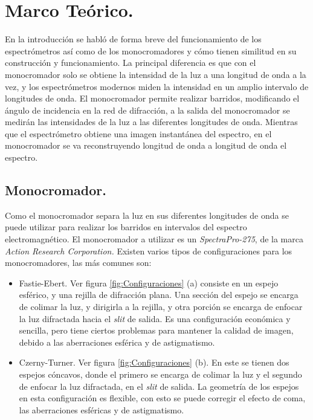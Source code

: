 \chapter{Marco Teórico.}
En la introducción se habló de forma breve del funcionamiento de los espectrómetros así como de los monocromadores y cómo tienen similitud en su construcción y funcionamiento. La principal diferencia es que con el monocromador solo se obtiene la intensidad de la luz a una longitud de onda a la vez, y los espectrómetros modernos miden la intensidad en un amplio intervalo de longitudes de onda. El monocromador permite realizar barridos, modificando el ángulo de incidencia en la red de difracción, a la salida del monocromador se medirán las intensidades de la luz a las diferentes longitudes de onda. Mientras que el espectrómetro obtiene una imagen instantánea del espectro, en el monocromador se va reconstruyendo longitud de onda a longitud de onda el espectro.

\section{Monocromador.}
Como el monocromador separa la luz en sus diferentes longitudes de onda se puede utilizar para realizar los barridos en intervalos del espectro electromagnético. 
El monocromador a utilizar es un \textit{SpectraPro-275}, de la marca \textit{Action Research Corporation.}
Existen varios tipos de configuraciones para los monocromadores, las más comunes son:

\begin{itemize}
	\item Fastie-Ebert. Ver figura \ref{fig:Configuraciones} (a) consiste en un espejo esférico, y una rejilla de difracción plana. Una sección del espejo se encarga de colimar la luz, y dirigirla a la rejilla, y otra porción se encarga de enfocar la luz difractada hacia el \textit{slit} de salida.
	Es una configuración económica y sencilla, pero tiene ciertos problemas para mantener la calidad de imagen, debido a las aberraciones esférica y de astigmatismo.
	\item  Czerny-Turner. Ver figura \ref{fig:Configuraciones} (b). En este se tienen dos espejos cóncavos, donde el primero se encarga de colimar la luz y el segundo de enfocar la luz difractada, en el \textit{slit} de salida. La geometría de los espejos en esta configuración es flexible, con esto se puede corregir el efecto de coma, las aberraciones esféricas y de astigmatismo. 
\end{itemize} 


